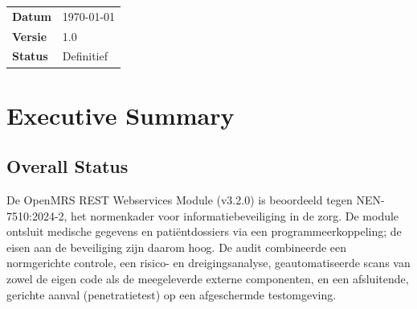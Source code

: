 \documentclass[12pt, a4paper]{report}
\begin{document}
\begin{titlepage}
\begin{minipage}[t]{14cm}
        \begin{tabular}{@{}ll}
            \textbf{Datum}   & \today \\[4pt]
            \textbf{Versie}  & 1.0 \\[4pt]
            \textbf{Status}  & Definitief \\[4pt]
        \end{tabular}

    \end{minipage}

    \vfill
    \noindent
    \colorbox{avansRed}{%
        \parbox[t][1.2cm]{\paperwidth}{%
            \vfill
            \vspace{0.3cm}
        }%
    }

    \restoregeometry
\end{titlepage}

\tableofcontents
\newpage

\chapter{Executive Summary}
\label{ch:executive-summary}

\section{Overall Status}
\label{sec:overall-status}

De OpenMRS REST Webservices Module (v3.2.0) is beoordeeld tegen
NEN-7510:2024-2, het normenkader voor informatiebeveiliging in de zorg. De
module ontsluit medische gegevens en patiëntdossiers via een
programmeerkoppeling; de eisen aan de beveiliging zijn daarom hoog. De audit
combineerde een normgerichte controle, een risico- en dreigingsanalyse,
geautomatiseerde scans van zowel de eigen code als de meegeleverde externe
componenten, en een afsluitende, gerichte aanval (penetratietest) op een
afgeschermde testomgeving.
\end{document}
